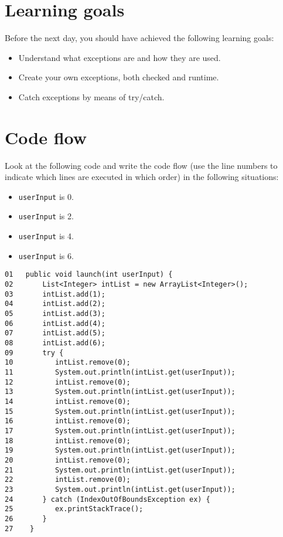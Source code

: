 \documentclass{article}
\begin{document}
\section*{Learning goals}
\label{sec:learning-goals}

Before the next day, you should have achieved the following learning
goals: 

\begin{itemize}
\item Understand what exceptions are and how they are used.
\item Create your own exceptions, both checked and runtime.
\item Catch exceptions by means of try/catch. 
\end{itemize}

\section{Code flow}
\label{sec:code-flow}

Look at the following code and write the code flow (use the line
numbers to indicate which lines are executed in which order) in the
following situations: 

\begin{itemize}
\item \verb+userInput+ is 0.
\item \verb+userInput+ is 2.
\item \verb+userInput+ is 4.
\item \verb+userInput+ is 6.
\end{itemize}

\begin{verbatim}
01   public void launch(int userInput) {
02       List<Integer> intList = new ArrayList<Integer>();
03       intList.add(1);
04       intList.add(2);
05       intList.add(3);
06       intList.add(4);
07       intList.add(5);
08       intList.add(6);
09       try {
10          intList.remove(0);
11          System.out.println(intList.get(userInput));
12          intList.remove(0);
13          System.out.println(intList.get(userInput));
14          intList.remove(0);
15          System.out.println(intList.get(userInput));
16          intList.remove(0);
17          System.out.println(intList.get(userInput));
18          intList.remove(0);
19          System.out.println(intList.get(userInput));
20          intList.remove(0);
21          System.out.println(intList.get(userInput));
22          intList.remove(0);
23          System.out.println(intList.get(userInput));
24       } catch (IndexOutOfBoundsException ex) {
25          ex.printStackTrace();
26       }
27    }
\end{verbatim}
\end{document}
